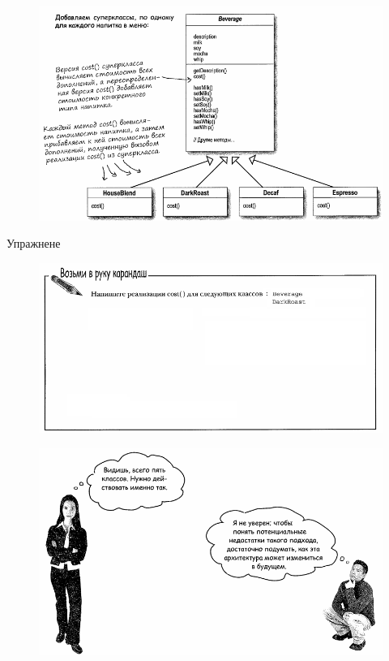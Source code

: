 \documentclass{beamer}
\begin{document}
\begin{frame}
\begin{figure}[h]
\centering
\includegraphics[scale=0.5]{images/lec10-pic06.png}
\label{pic-sort}
\end{figure}
\end{frame}

\begin{frame}{Упражнене}
\begin{figure}[h]
\centering
\includegraphics[scale=0.5]{images/lec10-pic07.png}
\label{pic-sort}
\end{figure}
\end{frame}

\begin{frame}
\begin{figure}[h]
\centering
\includegraphics[scale=0.5]{images/lec10-pic08.png}
\label{pic-sort}
\end{figure}
\end{frame}
\end{document}
